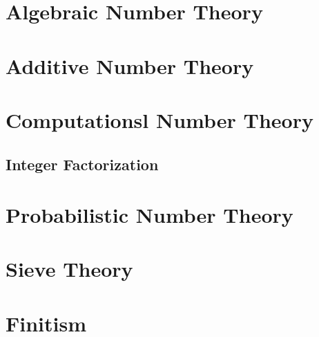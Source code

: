 \section{Algebraic Number Theory}\label{sec:algebraic_number_theory}

\section{Additive Number Theory}\label{sec:additive_number_theory}

\section{Computationsl Number Theory}\label{sec:computational_number_theory}

\subsection{Integer Factorization}\label{sec:integer_factorization}



\section{Probabilistic Number Theory}\label{sec:probabilistic_number_theory}

\section{Sieve Theory}\label{sec:sieve_theory}

\section{Finitism}\label{sec:finitism}

